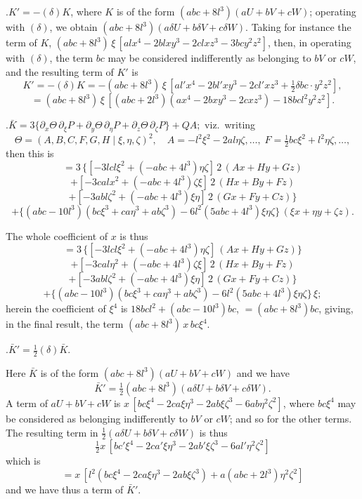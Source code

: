 \documentclass[11pt,a4paper]{article}
\begin{document}
\medskip{}.\quad $K'=-(\delta)K$, where $K$ is of the form
$(abc+8l^{3})(aU+bV+cW)$; operating with $(\delta)$, we obtain
$(abc+8l^{3})(a\delta U+b\delta V+c\delta W)$. Taking for instance the term of
$K$, $(abc+8l^{3})\,\xi\,[alx^{4}-2blxy^{3}-2clxz^{3}-3bcy^{2}z^{2}]$, then, in operating
with $(\delta)$, the term $bc$ may be considered indifferently as belonging to
$bV$ or $cW$, and the resulting term of $K'$ is
\[
  K'=-(\delta)K=-(abc+8l^{3})\,\xi\,[al'x^{4}-2bl'xy^{3}-2cl'xz^{3}+\tfrac{1}{2}\delta bc\cdot y^{2}z^{2}],
\]
\[
  =(abc+8l^{3})\,\xi\,[(abc+2l^{3})(ax^{4}-2bxy^{3}-2cxz^{3})-18bcl^{2}y^{2}z^{2}].
\]

\newpage
.\quad $\bar K=3\{\partial_{x}\Theta\,\partial_{\xi}P+\partial_{y}\Theta\,\partial_{\eta}P+\partial_{z}\Theta\,\partial_{\zeta}P\}+QA;$ viz.\ writing
\[
  \Theta=(A,B,C,F,G,H\mid\xi,\eta,\zeta)^{2},\quad A=-l^{2}\xi^{2}-2al\eta\zeta,\ldots,\;F=\tfrac{1}{2}bc\xi^{2}+l^{2}\eta\zeta,\ldots,
\]
then this is
\[
  =3\,\{[-3lcl\xi^{2}+(-abc+4l^{3})\eta\zeta]\,2\,(Ax+Hy+Gz)
\]
\[
  +[-3calx^{2}+(-abc+4l^{3})\zeta\xi]\,2\,(Hx+By+Fz)
\]
\[
  +[-3abl\zeta^{2}+(-abc+4l^{3})\xi\eta]\,2\,(Gx+Fy+Cz)\}
\]
\[
  +\{(abc-10l^{3})(bc\xi^{3}+ca\eta^{3}+ab\zeta^{3})-6l^{2}(5abc+4l^{3})\xi\eta\zeta\}\,(\xi x+\eta y+\zeta z).
\]

The whole coefficient of $x$ is thus
\[
  =3\,\{[-3lcl\xi^{2}+(-abc+4l^{3})\eta\zeta]\,(Ax+Hy+Gz)\}
\]
\[
  +[-3cal\eta^{2}+(-abc+4l^{3})\zeta\xi]\,2\,(Hx+By+Fz)
\]
\[
  +[-3abl\zeta^{2}+(-abc+4l^{3})\xi\eta]\,2\,(Gx+Fy+Cz)\}
\]
\[
  +\{(abc-10l^{3})(bc\xi^{3}+ca\eta^{3}+ab\zeta^{3})-6l^{2}(5abc+4l^{3})\xi\eta\zeta\}\,\xi;
\]
herein the coefficient of $\xi^{4}$ is $18bcl^{2}+(abc-10l^{3})bc$, $=(abc+8l^{3})bc$, giving, in the final result, the term $(abc+8l^{3})\,x\,bc\xi^{4}$.

\medskip{}.\quad $\bar K'=\tfrac{1}{2}(\delta)\bar K.$

Here $\bar K$ is of the form $(abc+8l^{3})(aU+bV+cW)$ and we have
\[
  \bar K'=\tfrac{1}{2}(abc+8l^{3})(a\delta U+b\delta V+c\delta W).
\]
A term of $aU+bV+cW$ is $x\,[bc\xi^{4}-2ca\xi\eta^{3}-2ab\xi\zeta^{3}-6ab\eta^{2}\zeta^{2}]$, where $bc\xi^{4}$ may be considered as belonging indifferently to $bV$ or $cW$; and so for the other terms. The resulting term in $\tfrac{1}{2}(a\delta U+b\delta V+c\delta W)$ is thus
\[
  \tfrac{1}{2}x\,[bc'\xi^{4}-2ca'\xi\eta^{3}-2ab'\xi\zeta^{3}-6al'\eta^{2}\zeta^{2}]
\]
which is
\[
  =x\,[l^{2}(bc\xi^{4}-2ca\xi\eta^{3}-2ab\xi\zeta^{3})+a(abc+2l^{3})\eta^{2}\zeta^{2}]
\]
and we have thus a term of $\bar K'$.
\end{document}
